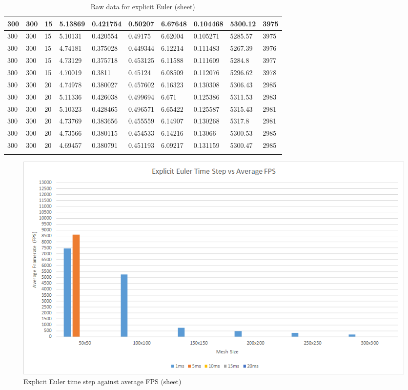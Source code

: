 \begin{landscape}
\begin{longtable}{ | l | l | l | l | l | l | l | l | l | l | }
300 & 300 & 15 & 5.13869 & 0.421754 & 0.50207 & 6.67648 & 0.104468 & 5300.12 & 3975\\ \hline
300 & 300 & 15 & 5.10131 & 0.420554 & 0.49175 & 6.62004 & 0.105271 & 5285.57 & 3975\\ \hline
300 & 300 & 15 & 4.74181 & 0.375028 & 0.449344 & 6.12214 & 0.111483 & 5267.39 & 3976\\ \hline
300 & 300 & 15 & 4.73129 & 0.375718 & 0.453125 & 6.11588 & 0.111609 & 5284.8 & 3977\\ \hline
300 & 300 & 15 & 4.70019 & 0.3811 & 0.45124 & 6.08509 & 0.112076 & 5296.62 & 3978\\ \hline
300 & 300 & 20 & 4.74978 & 0.380027 & 0.457602 & 6.16323 & 0.130308 & 5306.43 & 2985\\ \hline
300 & 300 & 20 & 5.11336 & 0.426038 & 0.499694 & 6.671 & 0.125386 & 5311.53 & 2983\\ \hline
300 & 300 & 20 & 5.10323 & 0.428465 & 0.496571 & 6.65422 & 0.125587 & 5315.43 & 2981\\ \hline
300 & 300 & 20 & 4.73769 & 0.383656 & 0.455559 & 6.14907 & 0.130268 & 5317.8 & 2981\\ \hline
300 & 300 & 20 & 4.73566 & 0.380115 & 0.454533 & 6.14216 & 0.13066 & 5300.53 & 2985\\ \hline
300 & 300 & 20 & 4.69457 & 0.380791 & 0.451193 & 6.09217 & 0.131159 & 5300.47 & 2985\\ \hline
   \caption{Raw data for explicit Euler (sheet)}
   \label{tab:ee raw sheet}
\end{longtable}

  \begin{figure}[!htb]
    \begin{center}
      \includegraphics{Figures/sheet_ee_fps}
    \end{center}
    \caption{Explicit Euler time step against average FPS (sheet)}
    \label{fig:ee fps sheet}
  \end{figure}
\end{landscape}
  
